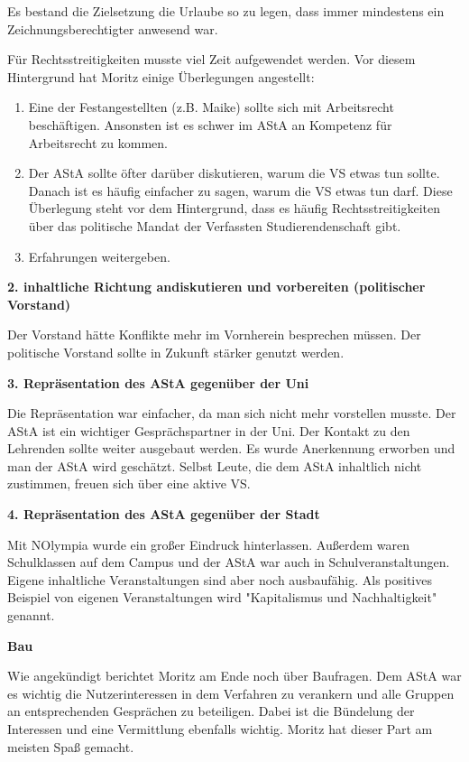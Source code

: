 \documentclass[ngerman,headheight=70pt]{scrartcl}
\begin{document}
    Es bestand die Zielsetzung die Urlaube so zu legen, dass immer mindestens ein
    Zeichnungsberechtigter anwesend war.

    Für Rechtsstreitigkeiten musste viel Zeit aufgewendet werden. Vor diesem
    Hintergrund hat Moritz einige Überlegungen angestellt:

    \begin{enumerate}
        \item Eine der Festangestellten (z.B. Maike) sollte sich mit
        Arbeitsrecht beschäftigen. Ansonsten ist es schwer im AStA an Kompetenz
        für Arbeitsrecht zu kommen.
        \item Der AStA sollte öfter darüber diskutieren, warum die VS etwas tun
        sollte. Danach ist es häufig einfacher zu sagen, warum die VS etwas tun
        darf. Diese Überlegung steht vor dem Hintergrund, dass es häufig
        Rechtsstreitigkeiten über das politische Mandat der Verfassten Studierendenschaft
        gibt.
        \item Erfahrungen weitergeben.
    \end{enumerate}

    \textbf{2. inhaltliche Richtung andiskutieren und vorbereiten (politischer
    Vorstand)}

    Der Vorstand hätte Konflikte mehr im Vornherein besprechen müssen.
    Der politische Vorstand sollte in Zukunft stärker genutzt werden.

    \textbf{3. Repräsentation des AStA gegenüber der Uni}

    Die Repräsentation war einfacher, da man sich nicht mehr vorstellen musste.
    Der AStA ist ein wichtiger Gesprächspartner in der Uni. Der Kontakt zu den
    Lehrenden sollte weiter ausgebaut werden. Es wurde Anerkennung erworben und
    man der AStA wird geschätzt. Selbst Leute, die dem AStA inhaltlich nicht
    zustimmen, freuen sich über eine aktive VS.

    \textbf{4. Repräsentation des AStA gegenüber der Stadt}

    Mit NOlympia wurde ein großer Eindruck hinterlassen. Außerdem waren
    Schulklassen auf dem Campus und der AStA war auch in Schulveranstaltungen.
    Eigene inhaltliche Veranstaltungen sind aber noch ausbaufähig.
    Als positives Beispiel von eigenen Veranstaltungen wird "Kapitalismus und
    Nachhaltigkeit" genannt.

    \textbf{Bau}

    Wie angekündigt berichtet Moritz am Ende noch über Baufragen.
    Dem AStA war es wichtig die Nutzerinteressen in dem Verfahren zu verankern
    und alle Gruppen an entsprechenden Gesprächen zu beteiligen.
    Dabei ist die Bündelung der Interessen und eine Vermittlung ebenfalls wichtig.
    Moritz hat dieser Part am meisten Spaß gemacht.
\end{document}

